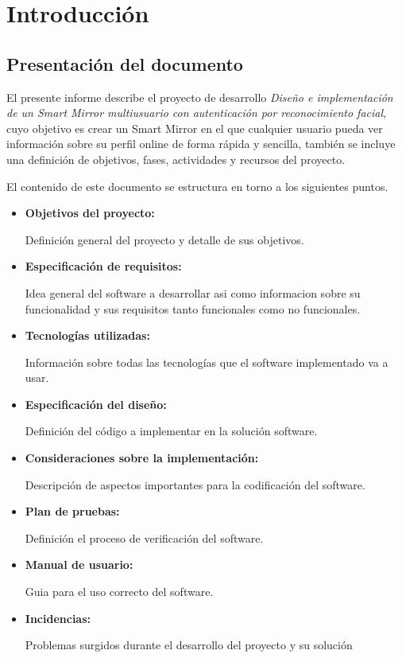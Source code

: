 \chapter{Introducción}\label{cha:introduccion}

\section{Presentación del documento}

El presente informe describe el proyecto de desarrollo \emph{Diseño e implementación de un Smart Mirror multiusuario con autenticación por reconocimiento facial}, cuyo objetivo es crear un Smart Mirror en el que cualquier usuario pueda ver información sobre su perfil online de forma rápida y sencilla, también se incluye una definición de objetivos, fases, actividades y recursos del proyecto.

El contenido de este documento se estructura en torno a los siguientes puntos.

\begin{itemize}
	\item \textbf{Objetivos del proyecto:}

	Definición general del proyecto y detalle de sus objetivos.

	\item \textbf{Especificación de requisitos:}
		
	Idea general del software a desarrollar asi como informacion sobre su funcionalidad y sus requisitos tanto funcionales como no funcionales.
	
	\item \textbf{Tecnologías utilizadas:}
		
	Información sobre todas las tecnologías que el software implementado va a usar.
	
	\item \textbf{Especificación del diseño:}

	Definición del código a implementar en la solución software.

	\item \textbf{Consideraciones sobre la implementación:}
	
	Descripción de aspectos importantes para la codificación del software.

	\item \textbf{Plan de pruebas:}

	Definición el proceso de verificación del software.

	\item \textbf{Manual de usuario:}
	
	Guia para el uso correcto del software.

	\item \textbf{Incidencias:}
	
	Problemas surgidos durante el desarrollo del proyecto y su solución

\end{itemize}

